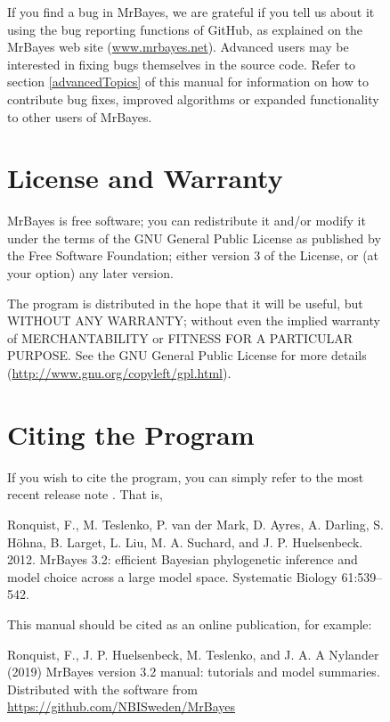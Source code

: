 \documentclass[12pt]{book}
\begin{document}
\begin{figure}[h]
If you find a bug in MrBayes, we are grateful if you tell us about it using the bug reporting
functions of GitHub, as explained on the MrBayes web site (\url{www.mrbayes.net}).
Advanced users may be interested in fixing bugs themselves in the source code. Refer to section
\ref{advancedTopics} of this manual for information on how to contribute bug fixes, improved
algorithms or expanded functionality to other users of MrBayes.

\section{License and Warranty}

MrBayes is free software; you can redistribute it and/or modify it under the terms of the GNU
General Public License as published by the Free Software Foundation; either version 3 of the
License, or (at your option) any later version.

The program is distributed in the hope that it will be useful, but WITHOUT ANY WARRANTY; without
even the implied warranty of MERCHANTABILITY or FITNESS FOR A PARTICULAR PURPOSE. See the GNU
General Public License for more details (\url{http://www.gnu.org/copyleft/gpl.html}).

\section{Citing the Program}

If you wish to cite the program, you can simply refer to the most recent release note
\citep{ronquist12b}. That is,

\begin{singlespacing}
\footnotesize
Ronquist, F., M. Teslenko, P. van der Mark, D. Ayres, A. Darling, S. H\"{o}hna,
B. Larget, L. Liu, M. A. Suchard, and J. P. Huelsenbeck. 2012. MrBayes 3.2:
efficient Bayesian phylogenetic inference and model choice across a large model
space. Systematic Biology 61:539--542.
\normalsize
\end{singlespacing}

This manual should be cited as an online publication, for example:

\begin{singlespacing}
\footnotesize
Ronquist, F., J. P. Huelsenbeck, M. Teslenko, and J. A. A Nylander (2019) MrBayes version 3.2 manual:
tutorials and model summaries. Distributed with the software from
\url{https://github.com/NBISweden/MrBayes}
\normalsize
\end{singlespacing}


\end{figure}
\end{document}
